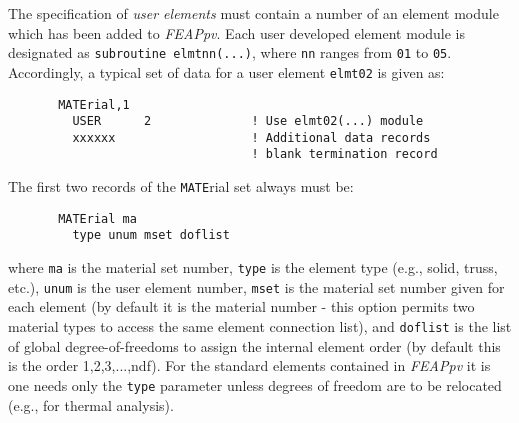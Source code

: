 The specification of {\it user elements} must contain a number of an
element module which has been added to {\sl FEAPpv}.
Each user developed element module
is designated as \texttt{subroutine elmtnn(...)}, where \texttt{nn} ranges
from \texttt{01} to \texttt{05}.
Accordingly, a typical set of data for a user element \texttt{elmt02}
is given as:
\begin{verbatim}
       MATErial,1
         USER      2              ! Use elmt02(...) module
         xxxxxx                   ! Additional data records
                                  ! blank termination record
\end{verbatim}

The first two records of the \texttt{MATE}rial set always must be:

\begin{verbatim}
       MATErial ma
         type unum mset doflist
\end{verbatim}
where \texttt{ma} is the material set number, \texttt{type} is the element type
(e.g., solid, truss, etc.), \texttt{unum} is the user element number,
\texttt{mset} is the material set number given for each element (by default
it is the material number - this option permits two material types
to access the same element connection list), and \texttt{doflist} is the
list of global degree-of-freedoms to assign the internal element order (by
default this is the order 1,2,3,...,ndf).  For the standard elements contained
in {\sl FEAPpv} it is one needs only the \texttt{type} parameter unless
degrees of freedom are to be relocated (e.g., for thermal analysis).
